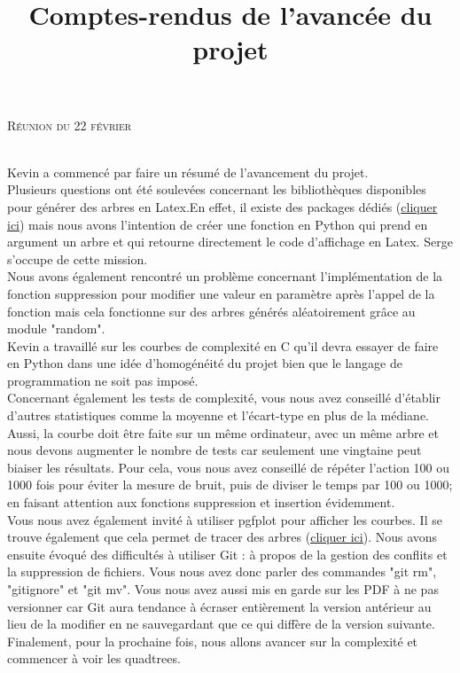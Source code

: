 \documentclass{article}
\begin{document}
\title{Comptes-rendus de l'avancée du projet}
\author{}
\date{}
\maketitle

\begin{center}
	\scshape{Réunion du 22 février}
\end{center}
~\\
Kevin a commencé par faire un résumé de l'avancement du projet.\\
Plusieurs questions ont été soulevées concernant les bibliothèques disponibles pour générer des arbres en Latex.En effet, il existe des packages dédiés (\href{https://tex.stackexchange.com/questions/5447/how-can-i-draw-simple-trees-in-latex}{\underline{cliquer ici}}) mais nous avons l'intention de créer une fonction en Python qui prend en argument un arbre et qui retourne directement le code d'affichage en Latex. Serge s'occupe de cette mission. \\
Nous avons également rencontré un problème concernant l'implémentation de la fonction suppression pour modifier une valeur en paramètre après l'appel de la fonction mais cela fonctionne sur des arbres générés aléatoirement grâce au module "random". \\
Kevin a travaillé sur les courbes de complexité en C qu'il devra essayer de faire en Python dans une idée d'homogénéité du projet bien que le langage de programmation ne soit pas imposé. \\
Concernant également les tests de complexité, vous nous avez conseillé d'établir d'autres statistiques comme la moyenne et l'écart-type en plus de la médiane. Aussi, la courbe doit être faite sur un même ordinateur, avec un même arbre et nous devons augmenter le nombre de tests car seulement une vingtaine peut biaiser les résultats. Pour cela, vous nous avez conseillé de répéter l'action 100 ou 1000 fois pour éviter la mesure de bruit, puis de diviser le temps par 100 ou 1000; en faisant attention aux fonctions suppression et insertion évidemment. \\
Vous nous avez également invité à utiliser pgfplot pour afficher les courbes. Il se trouve également que cela permet de tracer des arbres (\href{https://tex.stackexchange.com/questions/203399/drawing-binary-trees-with-latex-labels}{\underline{cliquer ici}}).
Nous avons ensuite évoqué des difficultés à utiliser Git : à propos de la gestion des conflits et la suppression de fichiers. Vous nous avez donc parler des commandes "git rm", "gitignore" et "git mv". Vous nous avez aussi mis en garde sur les PDF à ne pas versionner car Git aura tendance à écraser entièrement la version antérieur au lieu de la modifier en ne sauvegardant que ce qui diffère de la version suivante.\\

Finalement, pour la prochaine fois, nous allons avancer sur la complexité et commencer à voir les quadtrees.\\
\end{document}
